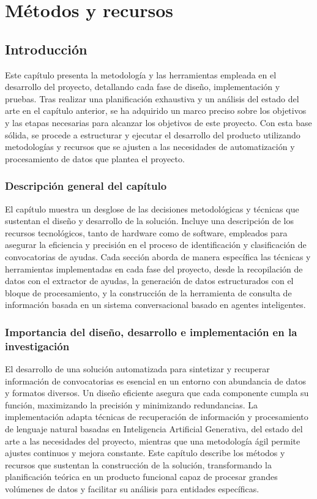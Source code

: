 \chapter{Métodos y recursos}
\label{chapter:Métodos y recursos}


\section{Introducción}

Este capítulo presenta la metodología y las herramientas empleada en el desarrollo del proyecto, detallando cada fase de diseño, implementación y pruebas. 
Tras realizar una planificación exhaustiva y un análisis del estado del arte en el capítulo anterior, se ha adquirido un marco preciso sobre los objetivos y las etapas necesarias para alcanzar los objetivos de este proyecto. 
Con esta base sólida, se procede a estructurar y ejecutar el desarrollo del producto utilizando metodologías y recursos que se ajusten a las necesidades de automatización y procesamiento de datos que plantea el proyecto.

\subsection{Descripción general del capítulo}

El capítulo muestra un desglose de las decisiones metodológicas y técnicas que sustentan el diseño y desarrollo de la solución. 
Incluye una descripción de los recursos tecnológicos, tanto de hardware como de software, empleados para asegurar la eficiencia y precisión en el proceso de identificación y clasificación de convocatorias de ayudas. 
Cada sección aborda de manera específica las técnicas y herramientas implementadas en cada fase del proyecto, desde la recopilación de datos con el extractor de ayudas, la generación de datos estructurados con el bloque de procesamiento, y la construcción de la herramienta de consulta de información basada en un sistema conversacional basado en agentes inteligentes.

\subsection{Importancia del diseño, desarrollo e implementación en la investigación}

El desarrollo de una solución automatizada para sintetizar y recuperar información de convocatorias es esencial en un entorno con abundancia de datos y formatos diversos. 
Un diseño eficiente asegura que cada componente cumpla su función, maximizando la precisión y minimizando redundancias. 
La implementación adapta técnicas de recuperación de información y procesamiento de lenguaje natural basadas en Inteligencia Artificial Generativa, del estado del arte a las necesidades del proyecto, mientras que una metodología ágil permite ajustes continuos y mejora constante.
Este capítulo describe los métodos y recursos que sustentan la construcción de la solución, transformando la planificación teórica en un producto funcional capaz de procesar grandes volúmenes de datos y facilitar su análisis para entidades específicas.

